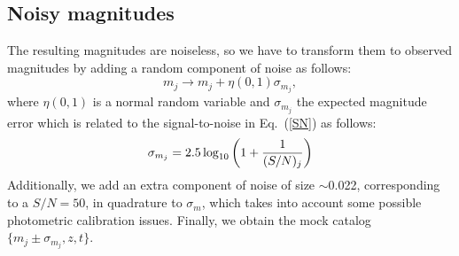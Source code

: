 \subsection{Noisy magnitudes}
The resulting magnitudes are noiseless, so we have to transform them to observed magnitudes by adding a random component of noise as follows:
\begin{equation}
m_j \rightarrow m_j + \eta(0,1)\sigma_{m_j},
\label{noiselesstonoisy}
\end{equation}
where $\eta(0,1)$ is a normal random variable and $\sigma_{m_j}$ the expected magnitude error which is related to the signal-to-noise in Eq.~(\ref{SN}) as follows:
\begin{equation}
\sigma_{m_j} = 2.5 \log_{10} \left(1 + {1 \over (S/N)_j} \right)
\label{errm}
\end{equation}
Additionally, we add an extra component of noise of size $\sim$0.022, corresponding to a $S/N=50$, in quadrature to $\sigma_m$, which takes into account some possible photometric calibration issues. Finally, we obtain the mock catalog $\lbrace m_j \pm \sigma_{m_j}, z,t \rbrace$. 

